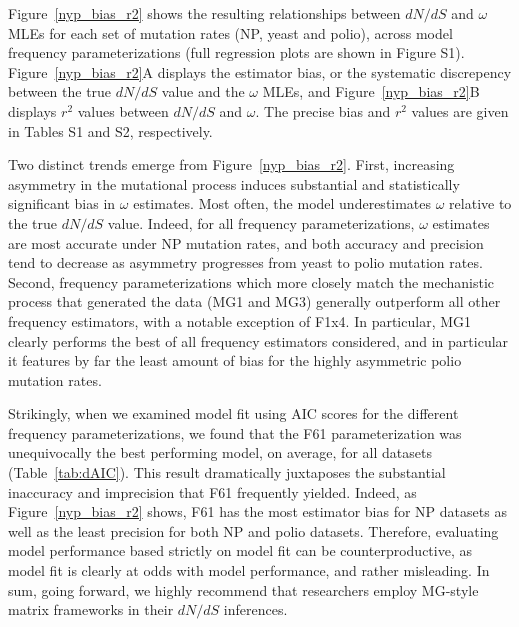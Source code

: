 \documentclass[11pt]{article}
\begin{document}
Figure~\ref{nyp_bias_r2} shows the resulting relationships between $dN/dS$ and $\omega$ MLEs for each set of mutation rates (NP, yeast and polio), across model frequency parameterizations (full regression plots are shown in Figure S1). Figure~\ref{nyp_bias_r2}A displays the estimator bias, or the systematic discrepency between the true $dN/dS$ value and the $\omega$ MLEs, and Figure~\ref{nyp_bias_r2}B displays $r^2$ values between $dN/dS$ and $\omega$. The precise bias and $r^2$ values are given in Tables S1 and S2, respectively.

Two distinct trends emerge from Figure~\ref{nyp_bias_r2}. First, increasing asymmetry in the mutational process induces substantial and statistically significant bias in $\omega$ estimates. Most often, the model underestimates $\omega$ relative to the true $dN/dS$ value.  Indeed, for all frequency parameterizations, $\omega$ estimates are most accurate under NP mutation rates, and both accuracy and precision tend to decrease as asymmetry progresses from yeast to polio mutation rates. Second, frequency parameterizations which more closely match the mechanistic process that generated the data (MG1 and MG3) generally outperform all other frequency estimators, with a notable exception of F1x4. In particular, MG1 clearly performs the best of all frequency estimators considered, and in particular it features by far the least amount of bias for the highly asymmetric polio mutation rates.

Strikingly, when we examined model fit using AIC scores \cite{Akaike1974} for the different frequency parameterizations, we found that the F61 parameterization was unequivocally the best performing model, on average, for all datasets (Table~\ref{tab:dAIC}). This result dramatically juxtaposes the substantial inaccuracy and imprecision that F61 frequently yielded. Indeed, as Figure~\ref{nyp_bias_r2} shows, F61 has the most estimator bias for NP datasets as well as the least precision for both NP and polio datasets. Therefore, evaluating model performance based strictly on model fit can be counterproductive, as model fit is clearly at odds with model performance, and rather misleading. In sum, going forward, we highly recommend that researchers employ MG-style matrix frameworks in their $dN/dS$ inferences.
\end{document}

